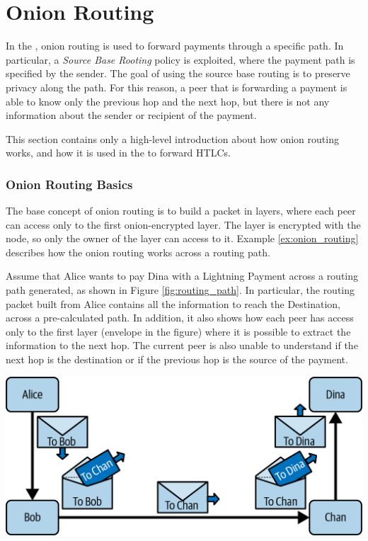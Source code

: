 \section{Onion Routing}\label{sec:onion_routing}

In the {\LN}, onion routing is used to forward payments through a specific path.
In particular, a \emph{Source Base Rooting} policy is exploited, where the payment path is specified by the sender.
The goal of using the source base routing is to preserve privacy along the path. For this reason, a peer that
is forwarding a payment is able to know only the previous hop and the next hop, but there is not any information
about the sender or recipient of the payment.

This section contains only a high-level introduction about how onion routing works, and how it is used in the {\LN} to forward HTLCs.

\subsubsection{Onion Routing Basics}

The base concept of onion routing is to build a packet in layers, where each peer can access only to the
first onion-encrypted layer. The layer is encrypted with the node, so only the owner of the layer can access to it.
Example \ref{ex:onion_routing} describes how the onion routing works across a routing path.

\begin{example}
  \label{ex:onion_routing}
  Assume that Alice wants to pay Dina with a Lightning Payment across a routing path generated, as shown in Figure \ref{fig:routing_path}.
  In particular, the routing packet built from Alice contains all the
  information to reach the Destination, across a pre-calculated path.
  In addition, it also shows how each peer has access only to the first layer (envelope in the figure) where it is possible to extract the information to the next hop.
  The current peer is also unable to understand if the next hop is the destination or if the previous hop is the source of the payment.

  {\centering
    \includegraphics[width=0.6\columnwidth]{imgs/mtln_1007.png}
    \par}
\end{example}

